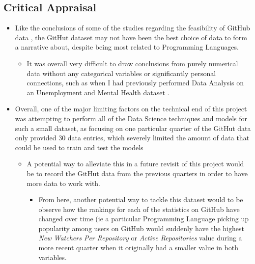 \documentclass{article}
\theoremstyle{theorem}
\theoremstyle{definition}
\theoremstyle{remark}
\begin{document}
\subsection{Critical Appraisal}
\begin{itemize}
    \item Like the conclusions of some of the studies regarding the feasibility of GitHub data \cite{MS}, the GitHut dataset may not have been the best choice of data to form a narrative about, despite being most related to Programming Languages.
    \begin{itemize}
        \item It was overall very difficult to draw conclusions from purely numerical data without any categorical variables or significantly personal connections, such as when I had previously performed Data Analysis on an Unemployment and Mental Health dataset \cite{MH}.
    \end{itemize}
    \item Overall, one of the major limiting factors on the technical end of this project was attempting to perform all of the Data Science techniques and models for such a small dataset, as focusing on one particular quarter of the GitHut data only provided 30 data entries, which severely limited the amount of data that could be used to train and test the models
    \begin{itemize}
        \item A potential way to alleviate this in a future revisit of this project would be to record the GitHut data from the previous quarters in order to have more data to work with.
        \begin{itemize}
            \item From here, another potential way to tackle this dataset would to be observe how the rankings for each of the statistics on GitHub have changed over time (ie a particular Programming Language picking up popularity among users on GitHub would suddenly have the highest \textit{New Watchers Per Repository} or \textit{Active Repositories} value during a more recent quarter when it originally had a smaller value in both variables.
        \end{itemize}
    \end{itemize}
\end{itemize}
\end{document}
